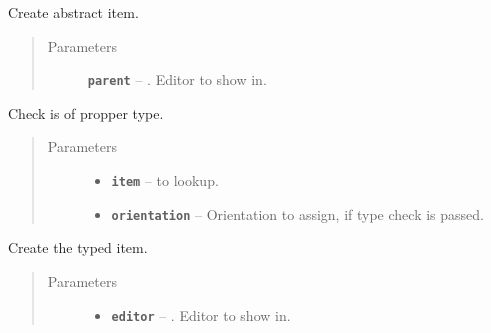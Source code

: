 \documentclass[a4paper,10pt,english]{sphinxmanual}
\begin{document}
\begin{fulllineitems}
\begin{quote}
\begin{description}
\end{description}\end{quote}

\begin{fulllineitems}
\label{model_link:model.AbstractItem.AbstractItem.__init__}
Create abstract item.
\begin{quote}\begin{description}
\item[{Parameters}] \leavevmode
\textbf{\texttt{parent}} -- . Editor to show in.

\end{description}\end{quote}

\end{fulllineitems}


\begin{fulllineitems}
\label{model_link:model.AbstractItem.AbstractItem.checkItem}
Check  is of propper type.
\begin{quote}\begin{description}
\item[{Parameters}] \leavevmode\begin{itemize}
\item {} 
\textbf{\texttt{item}} --  to lookup.

\item {} 
\textbf{\texttt{orientation}} -- Orientation to assign, if type check is passed.

\end{itemize}

\end{description}\end{quote}

\end{fulllineitems}


\begin{fulllineitems}
\label{model_link:model.AbstractItem.AbstractItem.createItem}
Create the typed item.
\begin{quote}\begin{description}
\item[{Parameters}] \leavevmode\begin{itemize}
\item {} 
\textbf{\texttt{editor}} -- . Editor to show in.


\end{itemize}
\end{description}
\end{quote}
\end{fulllineitems}
\end{fulllineitems}
\end{document}
